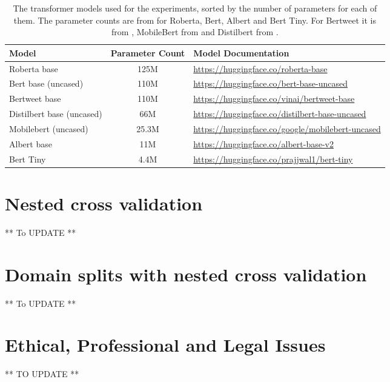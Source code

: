 \begin{table}[ht]
    \captionsetup{font=small}
    \centering
    \begin{tabularx}{\textwidth}{|l|c|X|}
        \hline
        \rowcolor[gray]{0.7}
        \textbf{Model} & \textbf{Parameter Count} & \textbf{Model Documentation} \\
        \hline
        Roberta base & 125M & \small{\url{https://huggingface.co/roberta-base}} \\
        \hline 
        Bert base (uncased) & 110M & \small{\url{https://huggingface.co/bert-base-uncased}} \\
        \hline
        Bertweet base & 110M & \small{\url{https://huggingface.co/vinai/bertweet-base}} \\
        \hline
        Distilbert base (uncased) & 66M & \small{\url{https://huggingface.co/distilbert-base-uncased}} \\
        \hline
        Mobilebert (uncased) & 25.3M & \small{\url{https://huggingface.co/google/mobilebert-uncased}} \\
        \hline
        Albert base & 11M & \small{\url{https://huggingface.co/albert-base-v2}} \\
        \hline
        Bert Tiny & 4.4M & \small{\url{https://huggingface.co/prajjwal1/bert-tiny}} \\
        \hline
    \end{tabularx}
    \caption{The transformer models used for the experiments, sorted by the number of parameters for each of them. The parameter counts are from \cite{bhargavaGeneralizationNLIWays2021} for Roberta, Bert, Albert and Bert Tiny. For Bertweet it is from \cite{nguyenBERTweetPretrainedLanguage2020}, MobileBert from \cite{sunMobileBERTCompactTaskAgnostic2020} and Distilbert from \cite{sanhDistilBERTDistilledVersion2020}.}    
    \label{tab: model_dtls}
\end{table} 


\section{Nested cross validation}
** To UPDATE **

\section{Domain splits with nested cross validation}
** To UPDATE **

\section{Ethical, Professional and Legal Issues}
** TO UPDATE **
